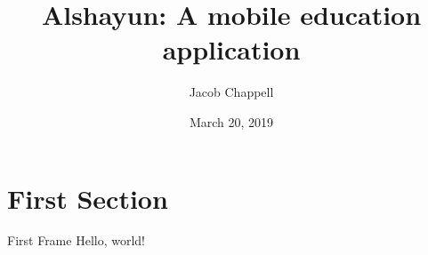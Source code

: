 \documentclass{beamer}
\title{Alshayun: A mobile education application}
\date{March 20, 2019}
\author{Jacob Chappell}
\institute{University of Kentucky}
\begin{document}
\maketitle

\section{First Section}

\begin{frame}{First Frame}
Hello, world!
\end{frame}
\end{document}
